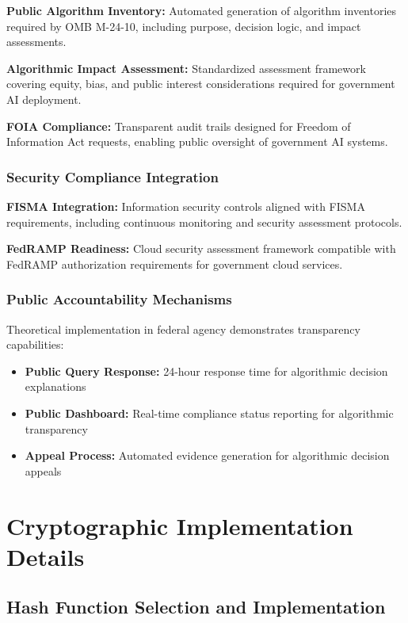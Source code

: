 \documentclass[12pt,a4paper]{article}
\begin{document}
\textbf{Public Algorithm Inventory:} Automated generation of algorithm inventories required by OMB M-24-10, including purpose, decision logic, and impact assessments.

\textbf{Algorithmic Impact Assessment:} Standardized assessment framework covering equity, bias, and public interest considerations required for government AI deployment.

\textbf{FOIA Compliance:} Transparent audit trails designed for Freedom of Information Act requests, enabling public oversight of government AI systems.

\subsubsection{Security Compliance Integration}

\textbf{FISMA Integration:} Information security controls aligned with FISMA requirements, including continuous monitoring and security assessment protocols.

\textbf{FedRAMP Readiness:} Cloud security assessment framework compatible with FedRAMP authorization requirements for government cloud services.

\subsubsection{Public Accountability Mechanisms}

Theoretical implementation in federal agency demonstrates transparency capabilities:

\begin{itemize}
\item \textbf{Public Query Response:} 24-hour response time for algorithmic decision explanations
\item \textbf{Public Dashboard:} Real-time compliance status reporting for algorithmic transparency
\item \textbf{Appeal Process:} Automated evidence generation for algorithmic decision appeals
\end{itemize}

\section{Cryptographic Implementation Details}

\subsection{Hash Function Selection and Implementation}
\end{document}
